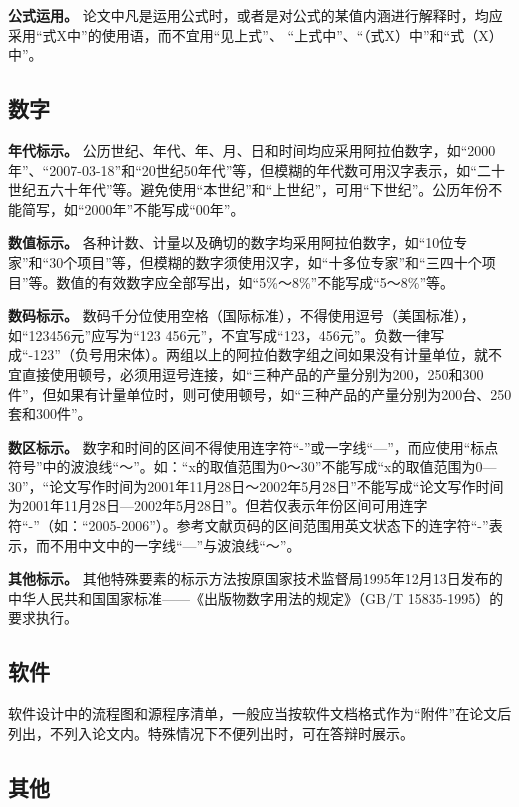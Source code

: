 \documentclass[doublesided]{Style/ucasthesis}%
\begin{document}
\textbf{公式运用。} 论文中凡是运用公式时，或者是对公式的某值内涵进行解释时，均应采用``式X中''的使用语，而不宜用``见上式''、 ``上式中''、``（式X）中''和``式（X）中''。

\hypertarget{section-31}{%
\subsection{数字}\label{section-31}}

\textbf{年代标示。} 公历世纪、年代、年、月、日和时间均应采用阿拉伯数字，如``2000年''、``2007-03-18''和``20世纪50年代''等，但模糊的年代数可用汉字表示，如``二十世纪五六十年代''等。避免使用``本世纪''和``上世纪''，可用``下世纪''。公历年份不能简写，如``2000年''不能写成``00年''。

\textbf{数值标示。} 各种计数、计量以及确切的数字均采用阿拉伯数字，如``10位专家''和``30个项目''等，但模糊的数字须使用汉字，如``十多位专家''和``三四十个项目''等。数值的有效数字应全部写出，如``5\%～8\%''不能写成``5～8\%''等。

\textbf{数码标示。} 数码千分位使用空格（国际标准），不得使用逗号（美国标准），如``123456元''应写为``123 456元''，不宜写成``123，456元''。负数一律写成``-123''（负号用宋体）。两组以上的阿拉伯数字组之间如果没有计量单位，就不宜直接使用顿号，必须用逗号连接，如``三种产品的产量分别为200，250和300件''，但如果有计量单位时，则可使用顿号，如``三种产品的产量分别为200台、250套和300件''。

\textbf{数区标示。} 数字和时间的区间不得使用连字符``-''或一字线``---''，而应使用``标点符号''中的波浪线``～''。如：``x的取值范围为0～30''不能写成``x的取值范围为0---30''，``论文写作时间为2001年11月28日～2002年5月28日''不能写成``论文写作时间为2001年11月28日---2002年5月28日''。但若仅表示年份区间可用连字符``-''（如：``2005-2006''）。参考文献页码的区间范围用英文状态下的连字符``-''表示，而不用中文中的一字线``---''与波浪线``～''。

\textbf{其他标示。} 其他特殊要素的标示方法按原国家技术监督局1995年12月13日发布的中华人民共和国国家标准------《出版物数字用法的规定》（GB/T 15835-1995）的要求执行。

\hypertarget{section-32}{%
\subsection{软件}\label{section-32}}

软件设计中的流程图和源程序清单，一般应当按软件文档格式作为``附件''在论文后列出，不列入论文内。特殊情况下不便列出时，可在答辩时展示。

\hypertarget{section-33}{%
\subsection{其他}\label{section-33}}
\end{document}
